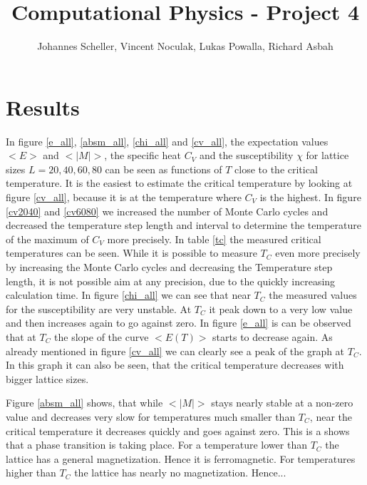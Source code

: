 \documentclass[10pt,a4paper]{article}
\author{Johannes Scheller, Vincent Noculak, Lukas Powalla, Richard Asbah}
\title{Computational Physics - Project 4}
\begin{document}
\maketitle
\newpage
\tableofcontents
\newpage


\section{Results}


In figure \ref{e_all}, \ref{absm_all}, \ref{chi_all} and \ref{cv_all}, the expectation values $<E>$ and $<|M|>$, the specific heat $C_V$ and the susceptibility $\chi$ for lattice sizes $L = 20, 40, 60, 80$ can be seen as functions of $T$ close to the critical temperature. It is the easiest to estimate the critical temperature by looking at figure \ref{cv_all}, because it is at the temperature where $C_V$ is the highest. In figure \ref{cv2040} and \ref{cv6080} we increased the number of Monte Carlo cycles and decreased the temperature step length and interval to determine the temperature of the maximum of $C_V$ more precisely. In table \ref{tc} the measured critical temperatures can be seen. While it is possible to measure $T_C$ even more precisely by increasing the Monte Carlo cycles and decreasing the Temperature step length, it is not possible aim at any precision, due to the quickly increasing calculation time. 
In figure \ref{chi_all} we can see that near $T_C$ the measured values for the susceptibility are very unstable. At $T_C$ it peak down to a very low value and then increases again to go against zero. In figure \ref{e_all} is can be observed that at $T_C$ the slope of the curve $<E(T)>$ starts to decrease again. As already mentioned in figure \ref{cv_all} we can clearly see a peak of the graph at $T_C$. In this graph it can also be seen, that the critical temperature decreases with bigger lattice sizes. 

Figure \ref{absm_all} shows, that while $<|M|>$ stays nearly stable at a non-zero value and decreases very slow for temperatures much smaller than $T_C$, near the critical temperature it decreases quickly and goes against zero. This is a shows that a phase transition is taking place. For a temperature lower than $T_C$ the lattice has a general magnetization. Hence it is ferromagnetic. For temperatures higher than $T_C$ the lattice has nearly no magnetization. Hence...
\end{document}
